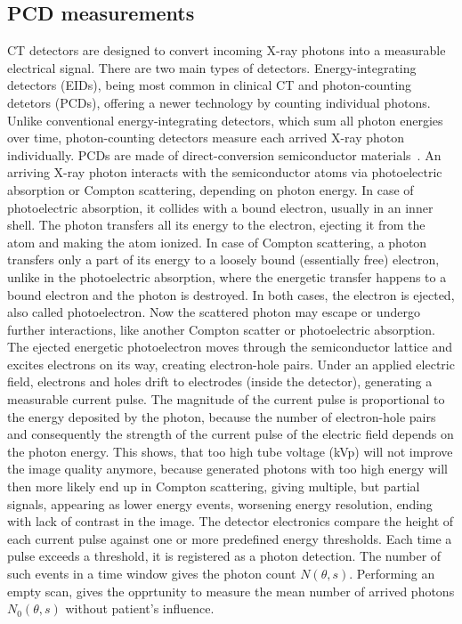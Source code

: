 \documentclass[12pt,a4paper]{article}
\begin{document}
\subsection{PCD measurements}
CT detectors are designed to convert incoming X-ray photons into a measurable electrical signal. There are two main types of detectors. Energy-integrating detectors (EIDs), being most common in clinical CT and photon-counting detetors (PCDs), offering a newer technology by counting individual photons. Unlike conventional energy-integrating detectors, which sum all photon energies over time, photon-counting detectors measure each arrived X-ray photon individually. PCDs are made of direct-conversion semiconductor materials~\cite{pcd_detec_paper}.
\newline\newline
An arriving X-ray photon interacts with the semiconductor atoms via photoelectric absorption or Compton scattering, depending on photon energy. In case of photoelectric absorption, it collides with a bound electron, usually in an inner shell. The photon transfers all its energy to the electron, ejecting it from the atom and making the atom ionized. In case of Compton scattering, a photon transfers only a part of its energy to a loosely bound (essentially free)  electron, unlike in the photoelectric absorption, where the energetic transfer happens to a bound electron and the photon is destroyed. In both cases, the electron is ejected, also called photoelectron. Now the scattered photon may escape or undergo further interactions, like another Compton scatter or photoelectric absorption. The ejected energetic photoelectron moves through the semiconductor lattice and excites electrons on its way, creating electron-hole pairs. Under an applied electric field, electrons and holes drift to electrodes (inside the detector), generating a measurable current pulse.  The magnitude of the current pulse is proportional to the energy deposited by the photon, because the number of electron-hole pairs and consequently the strength of the current pulse of the electric field depends on the photon energy. This shows, that too high tube voltage (kVp) will not improve the image quality anymore, because generated photons with too high energy will then more likely end up in Compton scattering, giving multiple, but partial signals, appearing as lower energy events, worsening energy resolution, ending with lack of contrast in the image.  The detector electronics compare the height of each current pulse against one or more predefined energy thresholds. Each time a pulse exceeds a threshold, it is registered as a photon detection. The number of such events in a time window gives the photon count $N(\theta, s)$. Performing an empty scan, gives the opprtunity to measure the mean number of arrived photons $N_0 (\theta, s)$ without patient's influence.
\end{document}
